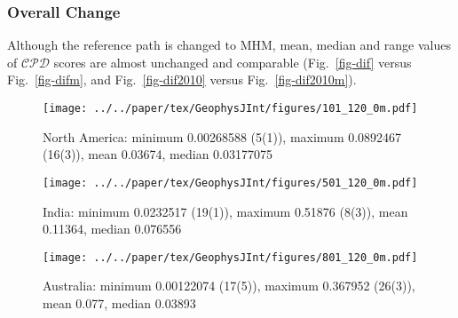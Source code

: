 \subsubsection{Overall Change}

Although the reference path is changed to MHM, mean, median and range values of
$\mathcal{CPD}$ scores are almost unchanged and comparable (Fig.~\ref{fig-dif}
versus Fig.~\ref{fig-difm}, and Fig.~\ref{fig-dif2010} versus
Fig.~\ref{fig-dif2010m}).

\begin{figure*}
	\centering
	\begin{subfigure}{1.01\textwidth}
		\texttt{[image: ../../paper/tex/GeophysJInt/figures/101\_120\_0m.pdf]}
		\caption{North America: minimum 0.00268588 (5(1)),
		maximum 0.0892467 (16(3)), mean 0.03674, median 0.03177075}\label{fig-na-difm}
	\end{subfigure}
	\vspace{.1em}
	\begin{subfigure}{1.01\textwidth}
		\texttt{[image: ../../paper/tex/GeophysJInt/figures/501\_120\_0m.pdf]}
		\caption{India: minimum 0.0232517 (19(1)), maximum 0.51876 (8(3)),
		mean 0.11364, median 0.076556}\label{fig-in-difm}
	\end{subfigure}
	\vspace{.1em}
	\begin{subfigure}{1.01\textwidth}
		\texttt{[image: ../../paper/tex/GeophysJInt/figures/801\_120\_0m.pdf]}
		\caption{Australia: minimum 0.00122074 (17(5)), maximum
		0.367952 (26(3)), mean 0.077, median 0.03893}\label{fig-au-difm}
	\end{subfigure}
	\caption[$\mathcal{CPD}$ of each plate's paleomagnetic APWPs vs
its MHM predicted APWP]{As Fig.~\ref{fig-dif}, here the reference path is
predicted from MHM\@. See the numbers of the picked paleopoles for methods in
Fig.~\ref{fig-dif}.}\label{fig-difm}
\end{figure*}

